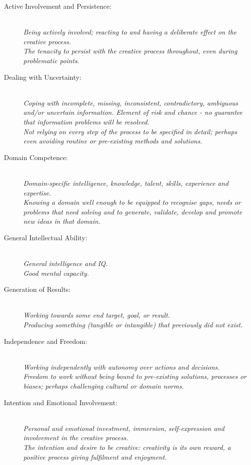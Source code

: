 \documentclass[10pt,letterpaper]{article}
\begin{document}
\begin{description}

\item[Active Involvement and Persistence:] \mbox{}\\
{\em Being actively involved; reacting to and having a deliberate effect on the creative process.\/}\\
{\em The tenacity to persist with the creative process throughout, even during problematic points\/}.

\item[Dealing with Uncertainty:] \mbox{}\\{\em
Coping with incomplete, missing, inconsistent, contradictory, ambiguous and/or uncertain information. Element of risk and chance - no guarantee that information problems will be resolved.\\
Not relying on every step of the process to be specified in detail; perhaps even avoiding routine or pre-existing methods and solutions.
}

\item[Domain Competence:] \mbox{}\\{\em
Domain-specific intelligence, knowledge, talent, skills, experience and expertise.\\
Knowing a domain well enough to be equipped to recognise gaps, needs or problems that need solving and to generate, validate, develop and promote new ideas in that domain.
}

\item[General Intellectual Ability:] \mbox{}\\{\em
General intelligence and IQ.\\
Good mental capacity.
}

\item[Generation of Results:] \mbox{}\\
{\em Working towards some end target, goal, or result.\/}\\
{\em Producing something (tangible or intangible) that previously did not exist.\/}


\item[Independence and Freedom:] \mbox{}\\{\em 
Working independently with autonomy over actions and decisions.\\
Freedom to work without being bound to pre-existing solutions, processes or biases; perhaps challenging cultural or domain norms.
}

\item[Intention and Emotional Involvement:] \mbox{}\\{\em
Personal and emotional investment, immersion, self-expression and involvement in the creative process.\\
The intention and desire to be creative: creativity is its own reward, a positive process giving fulfilment and enjoyment.
}


\end{description}
\end{document}
